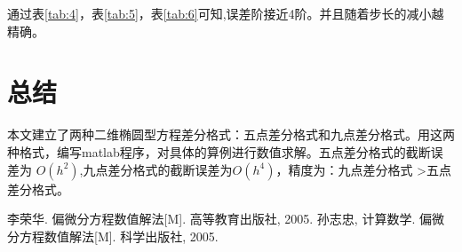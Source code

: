 \documentclass[withoutpreface,bwprint]{cumcmthesis} %
\begin{document}
通过表\ref{tab:4}，表\ref{tab:5}，表\ref{tab:6}可知,误差阶接近4阶。并且随着步长的减小越精确。

\section{总结}
本文建立了两种二维椭圆型方程差分格式：五点差分格式和九点差分格式。用这两种格式，编写matlab程序，对具体的算例进行数值求解。五点差分格式的截断误差为  $ O(h^2) $,九点差分格式的截断误差为$O(h^4) $，精度为：九点差分格式 >五点差分格式。

\newpage
\begin{thebibliography}{9}%
	李荣华. 偏微分方程数值解法[M]. 高等教育出版社, 2005.
	孙志忠, 计算数学. 偏微分方程数值解法[M]. 科学出版社, 2005.
\end{thebibliography}
\end{document}
